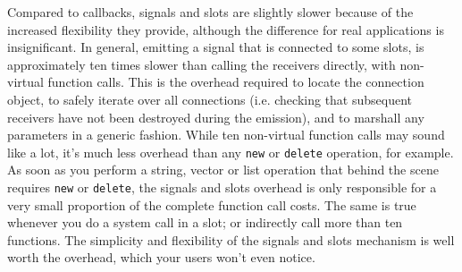 Compared to callbacks, signals and slots are slightly slower because of the
increased flexibility they provide, although the difference for real
applications is insignificant. In general, emitting a signal that is connected
to some slots, is approximately ten times slower than calling the receivers
directly, with non-virtual function calls. This is the overhead required to
locate the connection object, to safely iterate over all connections (i.e.
checking that subsequent receivers have not been destroyed during the emission),
and to marshall any parameters in a generic fashion. While ten non-virtual
function calls may sound like a lot, it's much less overhead than any
\texttt{new} or \texttt{delete} operation, for example. As soon as you perform a
string, vector or list operation that behind the scene requires \texttt{new} or
\texttt{delete}, the signals and slots overhead is only responsible for a very
small proportion of the complete function call costs. The same is true whenever
you do a system call in a slot; or indirectly call more than ten functions. The
simplicity and flexibility of the signals and slots mechanism is well worth the
overhead, which your users won't even notice.\cite{Qt:signal-slot}
